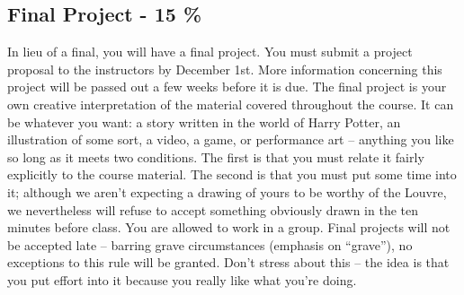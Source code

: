 \documentclass{article}
\begin{document}
\subsection*{Final Project - 15 \%}		
    In lieu of a final, you will have a final project. You must submit a project proposal to the instructors by December 1st. More information concerning this project will be passed out a few weeks before it is due. The final project is your own creative interpretation of the material covered throughout the course.  It can be whatever you want: a story written in the world of Harry Potter, an illustration of some sort, a video, a game, or performance art – anything you like so long as it meets two conditions.  The first is that you must relate it fairly explicitly to the course material. The second is that you must put some time into it; although we aren't expecting a drawing of yours to be worthy of the Louvre, we nevertheless will refuse to accept something obviously drawn in the ten minutes before class. You are allowed to work in a group. Final projects will not be accepted late – barring grave circumstances (emphasis on “grave”), no exceptions to this rule will be granted. Don’t stress about this – the idea is that you put effort into it because you really like what you’re doing.
\end{document}
